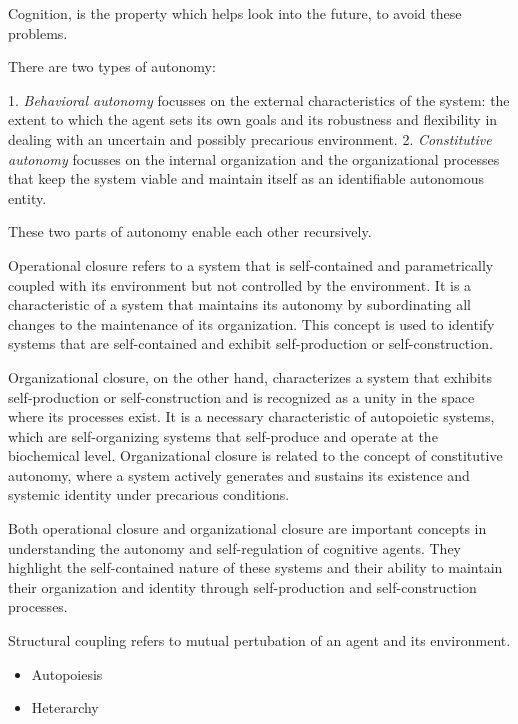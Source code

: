 
Cognition, is the property which helps look into the future, to avoid these problems.

There are two types of autonomy:

1. \emph{Behavioral autonomy} focusses on the external characteristics of the system: the extent to which the agent sets its own goals and its robustness and flexibility in dealing with an uncertain and possibly precarious environment.
2. \emph{Constitutive autonomy} focusses on the internal organization and the organizational processes that keep the system viable and maintain itself as an identifiable autonomous entity.

These two parts of autonomy enable each other recursively.


Operational closure refers to a system that is self-contained and parametrically coupled with its environment but not controlled by the environment. It is a characteristic of a system that maintains its autonomy by subordinating all changes to the maintenance of its organization. This concept is used to identify systems that are self-contained and exhibit self-production or self-construction.

Organizational closure, on the other hand, characterizes a system that exhibits self-production or self-construction and is recognized as a unity in the space where its processes exist. It is a necessary characteristic of autopoietic systems, which are self-organizing systems that self-produce and operate at the biochemical level. Organizational closure is related to the concept of constitutive autonomy, where a system actively generates and sustains its existence and systemic identity under precarious conditions.

Both operational closure and organizational closure are important concepts in understanding the autonomy and self-regulation of cognitive agents. They highlight the self-contained nature of these systems and their ability to maintain their organization and identity through self-production and self-construction processes.

Structural coupling refers to mutual pertubation of an agent and its environment.


\begin{itemize}
    \item Autopoiesis
    \item Heterarchy
\end{itemize}


